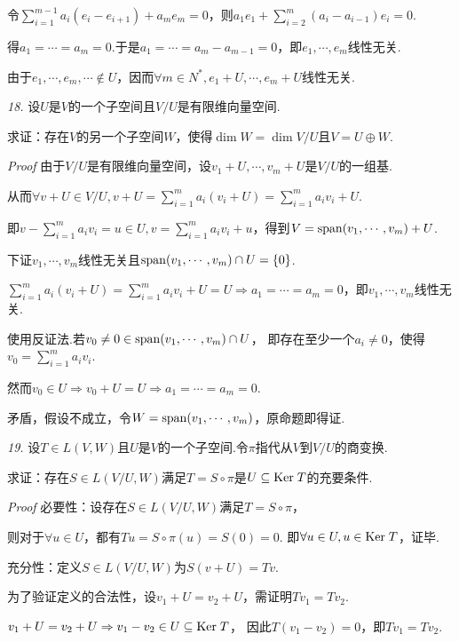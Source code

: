 令\(\sum_{i=1}^{m-1} a_i(e_i-e_{i+1})+a_me_m=0\)，则\(a_1e_1+\sum_{i=2}^m(a_i-a_{i-1})e_i=0\).

得\(a_1=\cdots=a_m=0\).于是\(a_1=\cdots=a_m-a_{m-1}=0\)，即\(e_1,\cdots,e_m\)线性无关.

由于\(e_1,\cdots,e_m,\cdots \notin U\)，因而\(\forall m \in N^*,e_1+U,\cdots,e_m+U\)线性无关.

\newpage

\textit{18.}
设\(U\)是\(V\)的一个子空间且\(V/U\)是有限维向量空间.

求证：存在\(V\)的另一个子空间\(W\)，使得\(\dim W=\dim V/U\)且\(V=U \oplus W\).

\textit{Proof}
由于\(V/U\)是有限维向量空间，设\(v_1+U,\cdots,v_m+U\)是\(V/U\)的一组基.

从而\(\forall v+U \in V/U,v+U=\sum_{i=1}^m a_i(v_i+U)=\sum_{i=1}^m a_iv_i+U\).

即\(v-\sum_{i=1}^m a_iv_i=u \in U,v=\sum_{i=1}^m a_iv_i+u\)，得到\(V=\mathrm{span} (v_1,\cdots,v_m)+U\).

下证\(v_1,\cdots,v_m\)线性无关且\(\mathrm{span} (v_1,\cdots,v_m) \cap U =\{0\}\).

\(\sum_{i=1}^m a_i(v_i+U)=\sum_{i=1}^m a_iv_i+U=U \Rightarrow a_1=\cdots=a_m=0\)，即\(v_1,\cdots,v_m\)线性无关.

使用反证法.若\(v_0 \ne 0 \in \mathrm{span} (v_1,\cdots,v_m) \cap U\)，
即存在至少一个\(a_i \ne 0\)，使得\(v_0=\sum_{i=1}^m a_iv_i\).

然而\(v_0 \in U \Rightarrow v_0+U=U \Rightarrow a_1=\cdots=a_m=0\).

矛盾，假设不成立，令\(W=\mathrm{span} (v_1,\cdots,v_m)\)，原命题即得证.

\hspace*{\fill}

\textit{19.}
设\(T \in L(V,W)\)且\(U\)是\(V\)的一个子空间.令\(\pi\)指代从\(V\)到\(V/U\)的商变换.

求证：存在\(S \in L(V/U,W)\)满足\(T=S \circ \pi\)是\(U \subseteq \mathrm{Ker \;} T\)的充要条件.

\textit{Proof}
必要性：设存在\(S \in L(V/U,W)\)满足\(T=S \circ \pi\)，

则对于\(\forall u \in U\)，都有\(Tu=S \circ \pi(u)=S(0)=0\).
即\(\forall u \in U,u \in \mathrm{Ker \;} T\)，证毕.

充分性：定义\(S \in L(V/U,W)\)为\(S(v+U)=Tv\).

为了验证定义的合法性，设\(v_1+U=v_2+U\)，需证明\(Tv_1=Tv_2\).

\(v_1+U=v_2+U \Rightarrow v_1-v_2 \in U \subseteq \mathrm{Ker \;} T\)，
因此\(T(v_1-v_2)=0\)，即\(Tv_1=Tv_2\).

